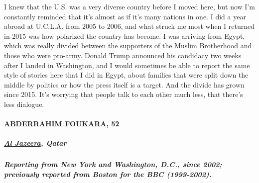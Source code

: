 I knew that the U.S. was a very diverse country before I moved here, but
now I'm constantly reminded that it's almost as if it's many nations in
one. I did a year abroad at U.C.L.A. from 2005 to 2006, and what struck
me most when I returned in 2015 was how polarized the country has
become. I was arriving from Egypt, which was really divided between the
supporters of the Muslim Brotherhood and those who were pro-army. Donald
Trump announced his candidacy two weeks after I landed in Washington,
and I would sometimes be able to report the same style of stories here
that I did in Egypt, about families that were split down the middle by
politics or how the press itself is a target. And the divide has grown
since 2015. It's worrying that people talk to each other much less, that
there's less dialogue.

\hypertarget{abderrahim-foukara-52}{%
\paragraph{ABDERRAHIM FOUKARA, 52}\label{abderrahim-foukara-52}}

\hypertarget{al-jazeera-qatar}{%
\subparagraph{\texorpdfstring{\textbf{\href{https://www.aljazeera.com/}{Al
Jazeera}, Qatar}}{Al Jazeera, Qatar}}\label{al-jazeera-qatar}}

\hypertarget{reporting-from-new-york-and-washington-dc-since-2002-previously-reported-from-boston-for-the-bbc-1999-2002}{%
\subparagraph{\texorpdfstring{\textbf{Reporting from New York and
Washington, D.C., since 2002; previously reported from Boston for the
BBC
(1999-2002).}}{Reporting from New York and Washington, D.C., since 2002; previously reported from Boston for the BBC (1999-2002).}}\label{reporting-from-new-york-and-washington-dc-since-2002-previously-reported-from-boston-for-the-bbc-1999-2002}}

